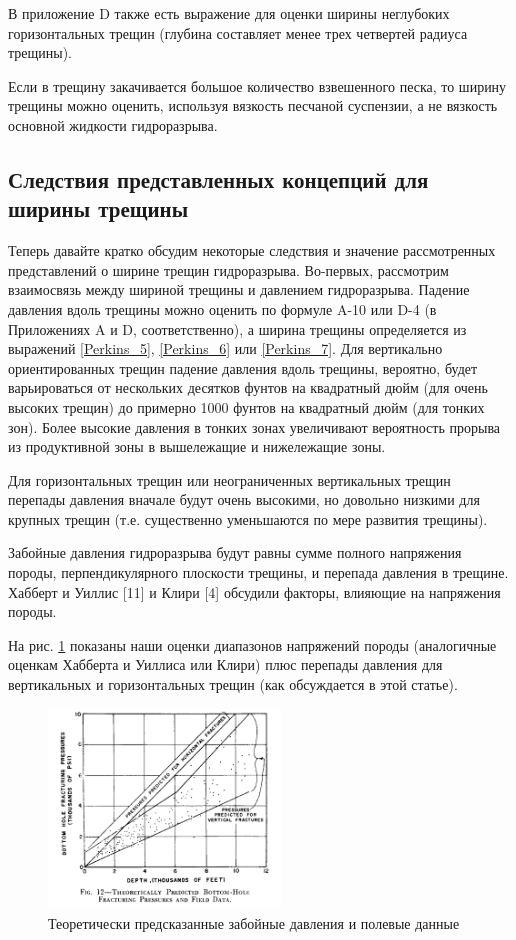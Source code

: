 \documentclass[a4paper, 12pt]{article}
\begin{document}
В приложение D также есть выражение для оценки ширины неглубоких горизонтальных трещин (глубина составляет менее трех четвертей радиуса трещины).

Если в трещину закачивается большое количество взвешенного песка, то ширину трещины можно оценить, используя вязкость песчаной суспензии, а не вязкость основной жидкости гидроразрыва.

\subsection{Следствия представленных концепций для ширины трещины}

Теперь давайте кратко обсудим некоторые следствия и значение рассмотренных представлений о ширине трещин гидроразрыва.
Во-первых, рассмотрим взаимосвязь между шириной трещины и давлением гидроразрыва.
Падение давления вдоль трещины можно оценить по формуле A-10 или D-4 (в Приложениях A и D, соответственно), а ширина трещины определяется из выражений \ref{Perkins_5}, \ref{Perkins_6} или \ref{Perkins_7}.
Для вертикально ориентированных трещин падение давления вдоль трещины, вероятно, будет варьироваться от нескольких десятков фунтов на квадратный дюйм (для очень высоких трещин) до примерно 1000 фунтов на квадратный дюйм (для тонких зон).
Более высокие давления в тонких зонах увеличивают вероятность прорыва из продуктивной зоны в вышележащие и нижележащие зоны.

Для горизонтальных трещин или неограниченных вертикальных трещин перепады давления вначале будут очень высокими, но довольно низкими для крупных трещин (т.е. существенно уменьшаются по мере развития трещины).

Забойные давления гидроразрыва будут равны сумме полного напряжения породы, перпендикулярного плоскости трещины, и перепада давления в трещине.
Хабберт и Уиллис [11] и Клири [4] обсудили факторы, влияющие на напряжения породы.

На рис. \ref{fig:Perkins12} показаны наши оценки диапазонов напряжений породы (аналогичные оценкам Хабберта и Уиллиса или Клири) плюс перепады давления для вертикальных и горизонтальных трещин (как обсуждается в этой статье).

\begin{figure}[H]
\center
\includegraphics[width=0.55\textwidth]{Perkins_12}
\caption{Теоретически предсказанные забойные давления и полевые данные}
\label{fig:Perkins12}
\end{figure}
\end{document}

